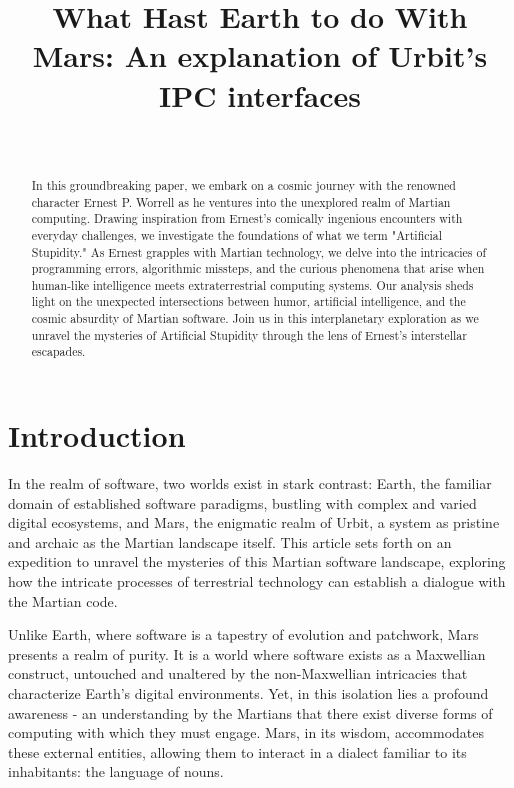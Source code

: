\documentclass[twoside]{article}
\title{What Hast Earth to do With Mars: An explanation of Urbit's IPC interfaces}
\author{~\authorpatp \\ \affiliation}
\date{}
\begin{document}
\maketitle
\thispagestyle{firststyle}

\begin{abstract}
In this groundbreaking paper, we embark on a cosmic journey with the renowned character Ernest P. Worrell as he ventures into the unexplored realm of Martian computing. Drawing inspiration from Ernest's comically ingenious encounters with everyday challenges, we investigate the foundations of what we term "Artificial Stupidity." As Ernest grapples with Martian technology, we delve into the intricacies of programming errors, algorithmic missteps, and the curious phenomena that arise when human-like intelligence meets extraterrestrial computing systems. Our analysis sheds light on the unexpected intersections between humor, artificial intelligence, and the cosmic absurdity of Martian software. Join us in this interplanetary exploration as we unravel the mysteries of Artificial Stupidity through the lens of Ernest's interstellar escapades.
\end{abstract}

\setcounter{page}{1}

\tableofcontents

\section{Introduction}

In the realm of software, two worlds exist in stark contrast: 
Earth, the familiar domain of established software paradigms, bustling with complex and varied digital ecosystems, 
and Mars, the enigmatic realm of Urbit, a system as pristine and archaic as the Martian landscape itself. 
This article sets forth on an expedition to unravel the mysteries of this Martian software landscape, 
exploring how the intricate processes of terrestrial technology can establish a dialogue with the Martian code.

Unlike Earth, where software is a tapestry of evolution and patchwork, Mars presents a realm of purity. 
It is a world where software exists as a Maxwellian construct, untouched and unaltered by the non-Maxwellian intricacies that characterize Earth’s digital environments. 
Yet, in this isolation lies a profound awareness - an understanding by the Martians that there exist diverse forms of computing with which they must engage. 
Mars, in its wisdom, accommodates these external entities, allowing them to interact in a dialect familiar to its inhabitants: the language of nouns.
\end{document}
